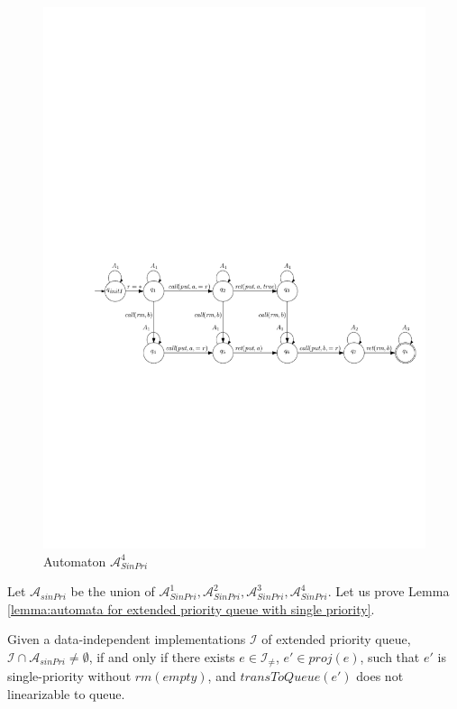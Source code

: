 \begin{figure}[htbp]
  \centering
  \includegraphics[width=0.9 \textwidth]{figures/PIC_AUTO_FIFO_4.pdf}
  \caption{Automaton $\mathcal{A}_{\textit{SinPri}}^4$}
  \label{fig:automata for FIFO-4}
\end{figure}

Let $\mathcal{A}_{\textit{sinPri}}$ be the union of $\mathcal{A}_{\textit{SinPri}}^1, \mathcal{A}_{\textit{SinPri}}^2, \mathcal{A}_{\textit{SinPri}}^3, \mathcal{A}_{\textit{SinPri}}^4$. Let us prove Lemma \ref{lemma:automata for extended priority queue with single priority}.

\begin{lemma}\label{lemma:automata for extended priority queue with single priority}
Given a data-independent implementations $\mathcal{I}$ of extended priority queue, $\mathcal{I} \cap \mathcal{A}_{\textit{sinPri}} \neq \emptyset$, if and only if there exists $e \in \mathcal{I}_{\neq}$, $e' \in \textit{proj}(e)$, such that $e'$ is single-priority  without $\textit{rm}(\textit{empty})$, and $\textit{transToQueue}(e')$ does not linearizable to queue.
\end{lemma}

